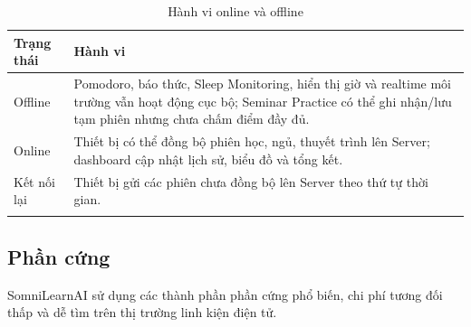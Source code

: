 \documentclass[12pt,a4paper]{article}
\begin{document}
\begin{longtable}{|P{3cm}|P{11.5cm}|}
\hline
\textbf{Trạng thái} & \textbf{Hành vi} \\
\hline
Offline & Pomodoro, báo thức, Sleep Monitoring, hiển thị giờ và realtime môi trường vẫn hoạt động cục bộ; Seminar Practice có thể ghi nhận/lưu tạm phiên nhưng chưa chấm điểm đầy đủ. \\
\hline
Online & Thiết bị có thể đồng bộ phiên học, ngủ, thuyết trình lên Server; dashboard cập nhật lịch sử, biểu đồ và tổng kết. \\
\hline
Kết nối lại & Thiết bị gửi các phiên chưa đồng bộ lên Server theo thứ tự thời gian. \\
\hline
\caption{Hành vi online và offline}
\end{longtable}

\subsection{Phần cứng}

SomniLearnAI sử dụng các thành phần phần cứng phổ biến, chi phí tương đối thấp và dễ tìm trên thị trường linh kiện điện tử.
\end{document}
